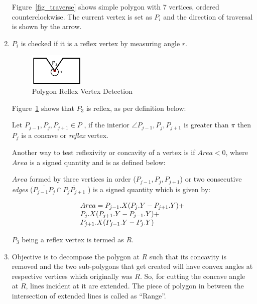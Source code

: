 \begin{enumerate}
Figure~\ref{fig_traverse} shows simple polygon with 7 vertices, ordered counterclockwise. The current vertex is set as $P_i$  and the direction of traversal is shown by the arrow.

\item 
$P_i$ is checked if it is a reflex vertex by measuring angle $r$.


\begin{figure}[h]
\centering \includegraphics[width=0.3\linewidth]{images/polydecomp_reflex_1.pdf} 
\caption{Polygon Reflex Vertex Detection}
\label{fig_reflex}
\end{figure}


Figure~\ref{fig_reflex} shows that $P_3$ is reflex, as per definition below:

Let  $ P_{j-1}, P_j,  P_{j+1} \in P $ , if the interior $\angle P_{j-1}, P_j,  P_{j+1}$ is greater than $\pi$  then $P_j$  is a concave or {\em reflex} vertex.

Another way to test reflexivity or concavity of a vertex is if $Area < 0$, where $Area$ is a signed quantity and is as defined below:

$Area$ formed by three vertices in order ($ P_{j-1}, P_j,  P_{j+1}$) or two consecutive {\em edges} ($ \overline{P_{j-1} P_j} \cap \overline{P_j P_{j+1}}$ ) is a signed quantity which is given by:

\begin{displaymath}
\begin{array}{l l}
Area = P_{j-1}.X ( P_j.Y - P_{j+1}.Y) + \\
P_j.X (P_{j+1}.Y -  P_{j-1}.Y) + \\
P_{j+1}.X ( P_{j-1}.Y - P_j.Y) 
 \end{array} 
\end{displaymath}

$P_3$ being a reflex vertex is termed as $R$.

\item 
Objective is to decompose the polygon at $R$ such that its concavity is removed and the two sub-polygons that get created will have convex angles at respective vertices which originally was $R$. So, for cutting the concave angle at $R$, lines incident at it are extended. The piece of polygon in between the intersection of extended lines is called as ``Range''. 


\end{enumerate}
